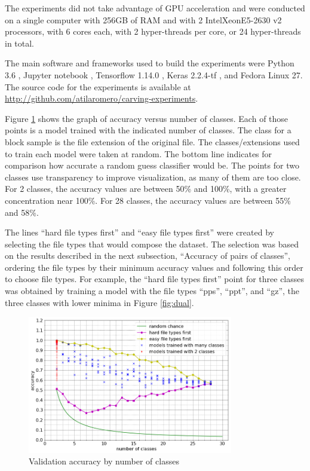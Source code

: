The experiments did not take advantage of GPU acceleration and were  conducted on a single computer with 256GB of RAM and with 2 Intel\textregistered Xeon\textregistered E5-2630 v2 processors, with 6 cores each, with 2 hyper-threads per core, or 24 hyper-threads in total. 


The main software and frameworks used to build the experiments were Python 3.6 
\cite{rossum_python_2019}, Jupyter notebook \cite{perez_jupyter_2019}, Tensorflow 1.14.0 \cite{google_brain_tensorflow_2019}, Keras 2.2.4-tf \cite{chollet_keras_2019}, and Fedora Linux 27.
The source code for the experiments is available at \sloppy\url{http://github.com/atilaromero/carving-experiments}.


Figure \ref{fig:nclasses} shows the graph of accuracy versus number of classes.  Each of those points is a model trained with the indicated number of classes. The class for a block sample is the file extension of the original file. The classes/extensions used to train each model were taken at random. The bottom line indicates for comparison how accurate a random guess classifier would be. The points for two classes use transparency to improve visualization, as many of them are too close. For 2 classes, the accuracy values are between 50\% and 100\%, with a greater concentration near 100\%. For 28 classes, the accuracy values are between 55\% and 58\%.

The lines ``hard file types first'' and ``easy file types first'' were created by selecting the file types that would compose the dataset. The selection was based on the results described in the next subsection, ``Accuracy of pairs of classes'', ordering the file types by their minimum accuracy values and following this order to choose file types. For example, the ``hard file types first'' point for three classes was obtained by training a model with the file types ``pps'', ``ppt'', and ``gz'', the three classes with lower minima in Figure \ref{fig:dual}.

\noindent
\begin{figure}[htb!]
\centering\includegraphics[width=0.8\textwidth]{content/nclasses.png}
\caption{\label{fig:nclasses}Validation accuracy by number of classes}%
\end{figure}

